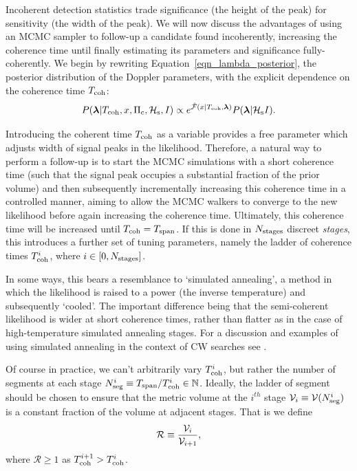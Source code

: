 \documentclass[aps, prd, twocolumn, superscriptaddress, floatfix, showpacs, nofootinbib, longbibliography]{revtex4-1}
\begin{document}
Incoherent detection statistics trade significance (the height of the peak) for
sensitivity (the width of the peak). We will now discuss the advantages of
using an MCMC sampler to follow-up a candidate found incoherently, increasing
the coherence time until finally estimating its parameters and significance
fully-coherently. We begin by rewriting Equation~\eqref{eqn_lambda_posterior},
the posterior distribution of the Doppler parameters, with the explicit
dependence on the coherence time $T_{\rm coh}$:
\begin{equation}
P(\boldsymbol{\mathbf{\lambda}} | T_{\rm coh}, x, \Pi_{\rm c}, \mathcal{H}_{\rm s}, I)
\propto e^{\hat{{\mathcal{F}}}(x| T_{\rm coh}, \boldsymbol{\mathbf{\lambda}})} P(\boldsymbol{\mathbf{\lambda}}| \mathcal{H}_{\rm s} I).
\end{equation}

Introducing the coherent time $T_{\rm coh}$ as a variable provides a free parameter
which adjusts width of signal peaks in the likelihood. Therefore, a natural way
to perform a follow-up is to start the MCMC simulations with a short coherence
time (such that the signal peak occupies a substantial fraction of the prior
volume) and then subsequently incrementally increasing this coherence time in a
controlled manner, aiming to allow the MCMC walkers to converge to the new
likelihood before again increasing the coherence time. Ultimately, this
coherence time will be increased until $T_{\rm coh} = T_{\rm span}$. If this is done in
$N_{\rm stages}$ discreet \emph{stages}, this introduces a further set of tuning
parameters, namely the ladder of coherence times $T_{\rm coh}^{i}$, where $i \in [0,
N_{\rm stages}]$.

In some ways, this bears a resemblance to `simulated annealing', a method in
which the likelihood is raised to a power (the inverse temperature) and
subsequently `cooled'. The important difference being that the semi-coherent
likelihood is wider at short coherence times, rather than flatter as in the
case of high-temperature simulated annealing stages. For a discussion and
examples of using simulated annealing in the context of CW searches see
\citet{veitch2007}.

Of course in practice, we can't arbitrarily vary $T_{\rm coh}^i$, but rather the
number of segments at each stage $N_{\rm seg}^{i}\equiv T_{\rm span}/T_{\rm coh}^{i} \in
\mathbb{N}$.  Ideally, the ladder of segment should be chosen to ensure that
the metric volume at the $i^{th}$ stage $\mathcal{V}_i \equiv \mathcal{V}(N_{\rm seg}^i)$ is a constant
fraction of the volume at adjacent stages. That is we define
\begin{equation}
\mathcal{R} \equiv \frac{\mathcal{V}_i}{\mathcal{V}_{i+1}},
\end{equation}
where $\mathcal{R} \ge 1$ as $T_{\rm coh}^{i+1} > T_{\rm coh}^{i}$.
\end{document}
